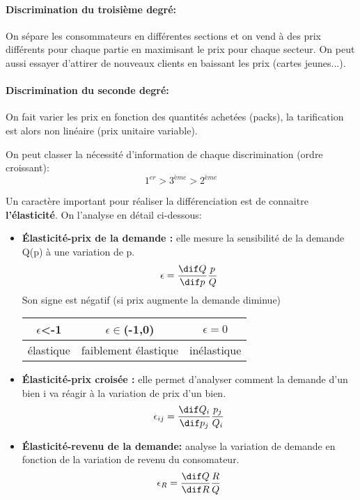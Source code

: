  \paragraph{Discrimination du troisième degré:} %
 \label{par:discrimination_du_troisieme_degre}
 On sépare les consommateurs en différentes sections et on vend à des prix différents pour chaque partie 
 en maximisant le prix pour chaque secteur. On peut aussi essayer d'attirer de nouveaux 
 clients en baissant les prix (cartes jeunes...).
 
 \paragraph{Discrimination du seconde degré:} %
 \label{par:discrimination_du_seconde_degre}
 On fait varier les prix en fonction des quantités achetées (packs), 
 la tarification est alors non linéaire (prix unitaire variable).
 


On peut classer la nécessité d'information de chaque discrimination (ordre croissant):
\[
	1^{er} > 3^{ème} > 2^{ème}
\]

Un caractère important pour réaliser la différenciation est de connaitre \textbf{l'élasticité}. On l'analyse en détail ci-dessous:

\begin{tcolorbox}[title=Élasticités]
	\begin{itemize}[label=]
		\item \textbf{Élasticité-prix de la demande :} elle mesure la sensibilité de la demande Q(p) à une variation de p. 
		\[
			\epsilon = \frac{\dif Q}{\dif p}\frac{p}{Q}
		\]
		Son signe est négatif (si prix augmente la demande diminue)
		\begin{tabular}{|c|c|c|}
		\hline
		$\epsilon$<-1 & $\epsilon \in$(-1,0) & $\epsilon =0$ \\
		\hline 
		élastique & faiblement élastique & inélastique \\
		\hline
		\end{tabular}
	
	
	
		\item \textbf{Élasticité-prix croisée :} elle permet d'analyser comment la demande d'un bien i va réagir à la variation de prix d'un bien.
		\[
			\epsilon_{ij} = \frac{\dif Q_i}{\dif p_j}\frac{p_j}{Q_i}
		\]
		\item \textbf{Élasticité-revenu de la demande:} analyse la variation de demande en fonction de la variation de revenu du consomateur.
		\[
			\epsilon_R = \frac{\dif Q}{\dif R}\frac{R}{Q}
		\]
	\end{itemize}
\end{tcolorbox}

